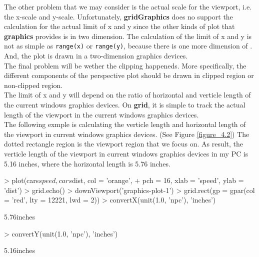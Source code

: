 \documentclass[paper=a4, fontsize=11pt]{report}
\begin{document}
The other problem that we may consider is the actual scale for the viewport, i.e. the x-scale and y-scale. Unfortunately, \textbf{gridGraphics} does no support the calculation for the actual limit of x and y since the other kinds of plot that \textbf{graphics} provides is in two dimension. The calculation of the limit of x and y is not as simple as \texttt{range(x)} or \texttt{range(y)}, because there is one more dimension of . And, the plot is drawn in a two-dimension graphics devices.\\

The final problem will be wether the clipping happeneds. More specifically, the different components of the perspective plot should be drawn in clipped region or non-clipped region. \\

The limit of x and y will depend on the ratio of horizontal and verticle length of the current windows graphics devices. On \textbf{grid}, it is simple to track the actual length of the viewport in the current windows graphics devices. \\

The following exmple is calculating the verticle length and horizontal length of the viewport in current windows graphics devices. (See Figure \ref{figure_4.2}) The dotted rectangle region is the viewport region that we focus on. As result, the verticle length of the viewport in current windows graphics devices in my PC is 5.16 inches, where the horizontal length is 5.76 inches. \\


\begin{Schunk}
\begin{Sinput}
> plot(cars$speed, cars$dist, col = 'orange', 
+       pch = 16, xlab = 'speed', ylab = 'dist')
> grid.echo()
> downViewport('graphics-plot-1')
> grid.rect(gp = gpar(col = 'red', lty = 12221, lwd = 2))
> convertX(unit(1.0, 'npc'), 'inches')
\end{Sinput}
\begin{Soutput}
[1] 5.76inches
\end{Soutput}
\begin{Sinput}
> convertY(unit(1.0, 'npc'), 'inches')
\end{Sinput}
\begin{Soutput}
[1] 5.16inches
\end{Soutput}
\end{Schunk}
\end{document}
